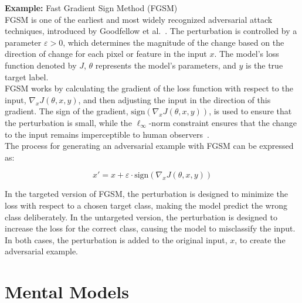 \documentclass[a4paper, oneside]{discothesis}
\begin{document}
\begin{examplebox}
	\textbf{Example:} Fast Gradient Sign Method (FGSM) \\

	FGSM is one of the earliest and most widely recognized adversarial attack techniques, introduced by Goodfellow et al.~\cite{goodfellow2014explaining}. The perturbation is controlled by a parameter $\varepsilon > 0$, which determines the magnitude of the change based on the direction of change for each pixel or feature in the input $x$. The model's loss function denoted by $J$, $\theta$ represents the model's parameters, and $y$ is the true target label. \\
	
	FGSM works by calculating the gradient of the loss function with respect to the input, $\nabla_x J(\theta, x, y)$, and then adjusting the input in the direction of this gradient. The sign of the gradient, $\text{sign}(\nabla_x J(\theta, x, y))$, is used to ensure that the perturbation is small, while the $\ell_\infty$-norm constraint ensures that the change to the input remains imperceptible to human observers~\cite{zhang2019adversarial}. \\
	
	The process for generating an adversarial example with FGSM can be expressed as:
	
	$$x' = x + \varepsilon \cdot \text{sign}(\nabla_x J(\theta, x, y))$$
	
	In the targeted version of FGSM, the perturbation is designed to minimize the loss with respect to a chosen target class, making the model predict the wrong class deliberately. In the untargeted version, the perturbation is designed to increase the loss for the correct class, causing the model to misclassify the input. In both cases, the perturbation is added to the original input, $x$, to create the adversarial example.
\end{examplebox}







\section{Mental Models}
\end{document}

